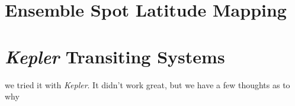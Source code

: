 \documentclass[preprint2]{aastex62}
\newcommand{\Kepler}{\textsl{Kepler}\xspace}
\begin{document}
\section{Ensemble Spot Latitude Mapping}






%
%
%









\section{\Kepler Transiting Systems}
we tried it with \Kepler. It didn't work great, but we have a few thoughts as to why
\end{document}
